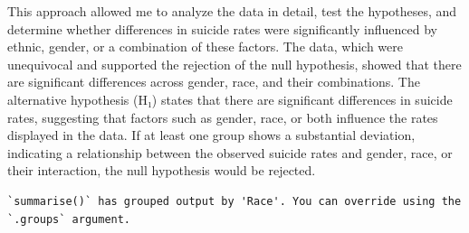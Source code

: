 \documentclass[
  letterpaper,
  DIV=11,
  numbers=noendperiod]{scrartcl}
\begin{document}
This approach allowed me to analyze the data in detail, test the
hypotheses, and determine whether differences in suicide rates were
significantly influenced by ethnic, gender, or a combination of these
factors. The data, which were unequivocal and supported the rejection of
the null hypothesis, showed that there are significant differences
across gender, race, and their combinations. The alternative hypothesis
(H₁) states that there are significant differences in suicide rates,
suggesting that factors such as gender, race, or both influence the
rates displayed in the data. If at least one group shows a substantial
deviation, indicating a relationship between the observed suicide rates
and gender, race, or their interaction, the null hypothesis would be
rejected.

\begin{verbatim}
`summarise()` has grouped output by 'Race'. You can override using the
`.groups` argument.
\end{verbatim}
\end{document}
